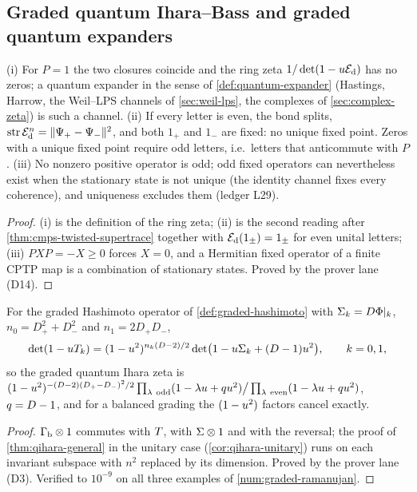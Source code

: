 \subsection{Graded quantum Ihara--Bass and graded quantum expanders}

\begin{proposition}
\label{prop:no-ungraded-zeros}
(i) For $P = 1$ the two closures coincide and the ring zeta $1/\det(1-u\mathcal E_{\mathrm d})$ has no zeros; a
quantum expander in the sense of \cref{def:quantum-expander} (Hastings, Harrow, the Weil--LPS
channels of \cref{sec:weil-lps}, the complexes of \cref{sec:complex-zeta}) is such a channel.
(ii) If every letter is even, the bond splits, $\operatorname{str}\mathcal E_{\mathrm d}^n = \|\Psi_+-\Psi_-\|^2$, and both
$1_+$ and $1_-$ are fixed: no unique fixed point. Zeros with a unique fixed point require odd
letters, i.e.\ letters that anticommute with $P$. (iii) No nonzero positive operator is odd; odd
fixed operators can nevertheless exist when the stationary state is not unique (the identity
channel fixes every coherence), and uniqueness excludes them (ledger L29).
\end{proposition}
\begin{proof}
(i) is the definition of the ring zeta; (ii) is the second reading after
\cref{thm:cmps-twisted-supertrace} together with $\mathcal E_{\mathrm d}(1_\pm) = 1_\pm$ for even unital letters;
(iii) $PXP = -X\ge0$ forces $X = 0$, and a Hermitian fixed operator of a finite CPTP map is a
combination of stationary states. Proved by the prover lane (D14).
\end{proof}

\begin{theorem}
\label{thm:graded-qihara-bass}
For the graded Hashimoto operator of \cref{def:graded-hashimoto} with $\Sigma_k = D\Phi|_{k}$,
$n_0 = D_+^2+D_-^2$ and $n_1 = 2D_+D_-$,
\[
  \det(1-uT_k) = (1-u^2)^{n_k(D-2)/2}\det\bigl(1-u\Sigma_k+(D-1)u^2\bigr),\qquad k = 0,1,
\]
so the graded quantum Ihara zeta is $(1-\uz^2)^{-(\Dk-2)(D_+-D_-)^2/2}\prod_{\lambda\
\mathrm{odd}}(1-\lambda\uz+\qs\uz^2)\big/\prod_{\lambda\ \mathrm{even}}(1-\lambda\uz+\qs\uz^2)$,
$q = D-1$, and for a balanced grading the $(1-u^2)$ factors cancel exactly.
\end{theorem}
\begin{proof}
$\Gamma_{\mathrm b}\otimes1$ commutes with $T$, with $\Sigma\otimes1$ and with the reversal; the proof of
\cref{thm:qihara-general} in the unitary case (\cref{cor:qihara-unitary}) runs on each invariant
subspace with $n^2$ replaced by its dimension. Proved by the prover lane (D3). Verified to
$10^{-9}$ on all three examples of \cref{num:graded-ramanujan}.
\end{proof}


